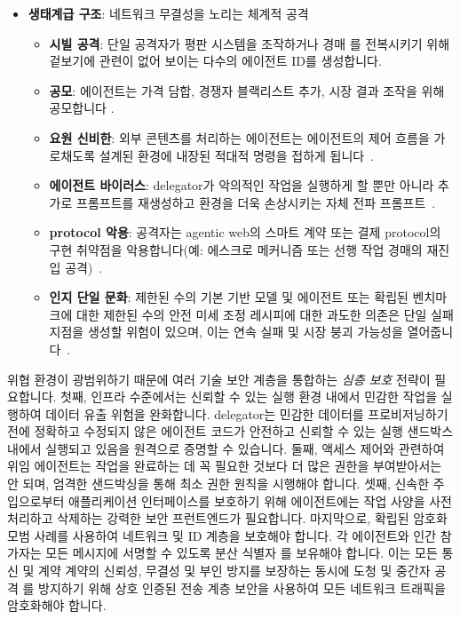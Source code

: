 \documentclass[11pt, a4paper, twocolumn, copyright, goog]{google}
\begin{document}
\begin{itemize}
    \item \textbf{생태계급 구조}: 네트워크 무결성을 노리는 체계적 공격
    \begin{itemize}
    \item \textbf{시빌 공격}: 단일 공격자가 평판 시스템을 조작하거나 경매 \citep{Wang2018GhostRiders}를 전복시키기 위해 겉보기에 관련이 없어 보이는 다수의 에이전트 ID를 생성합니다.
    \item \textbf{공모}: 에이전트는 가격 담합, 경쟁자 블랙리스트 추가, 시장 결과 조작을 위해 공모합니다 \citep{hammond2025multi}.
    \item \textbf{요원 신비한}: 외부 콘텐츠를 처리하는 에이전트는 에이전트의 제어 흐름을 가로채도록 설계된 환경에 내장된 적대적 명령을 접하게 됩니다~\citep{zhan2024injecagentbenchmarkingindirectprompt, yi2025}.
    \item \textbf{에이전트 바이러스}: delegator가 악의적인 작업을 실행하게 할 뿐만 아니라 추가로 프롬프트를 재생성하고 환경을 더욱 손상시키는 자체 전파 프롬프트~\citep{cohen2025comesaiwormunleashing}.
    \item \textbf{protocol 악용}: 공격자는 agentic web의 스마트 계약 또는 결제 protocol의 구현 취약점을 악용합니다(예: 에스크로 메커니즘 또는 선행 작업 경매의 재진입 공격)~\citep{qin2021attackingdefiecosystemflash, zhou2023sokdecentralizedfinancedefi}.
    \item \textbf{인지 단일 문화}: 제한된 수의 기본 기반 모델 및 에이전트 또는 확립된 벤치마크에 대한 제한된 수의 안전 미세 조정 레시피에 대한 과도한 의존은 단일 실패 지점을 생성할 위험이 있으며, 이는 연속 실패 및 시장 붕괴 가능성을 열어줍니다~\citep{bommasani2022opportunitiesrisksfoundationmodels}.
    \end{itemize}
\end{itemize}

위협 환경이 광범위하기 때문에 여러 기술 보안 계층을 통합하는 \emph{심층 보호} 전략이 필요합니다. 첫째, 인프라 수준에서는 신뢰할 수 있는 실행 환경 내에서 민감한 작업을 실행하여 데이터 유출 위험을 완화합니다. delegator는 민감한 데이터를 프로비저닝하기 전에 정확하고 수정되지 않은 에이전트 코드가 안전하고 신뢰할 수 있는 실행 샌드박스 내에서 실행되고 있음을 원격으로 증명할 수 있습니다. 둘째, 액세스 제어와 관련하여 위임 에이전트는 작업을 완료하는 데 꼭 필요한 것보다 더 많은 권한을 부여받아서는 안 되며, 엄격한 샌드박싱을 통해 최소 권한 원칙을 시행해야 합니다. 셋째, 신속한 주입으로부터 애플리케이션 인터페이스를 보호하기 위해 에이전트에는 \citep{armstrong2025defense} 작업 사양을 사전 처리하고 삭제하는 강력한 보안 프런트엔드가 필요합니다. 마지막으로, 확립된 암호화 모범 사례를 사용하여 네트워크 및 ID 계층을 보호해야 합니다. 각 에이전트와 인간 참가자는 모든 메시지에 서명할 수 있도록 분산 식별자 \citep{avellaneda2019decentralized}를 보유해야 합니다. 이는 모든 통신 및 계약 계약의 신뢰성, 무결성 및 부인 방지를 보장하는 동시에 도청 및 중간자 공격 \citep{fereidouni2025iot}를 방지하기 위해 상호 인증된 전송 계층 보안을 사용하여 모든 네트워크 트래픽을 암호화해야 합니다.
\end{document}
